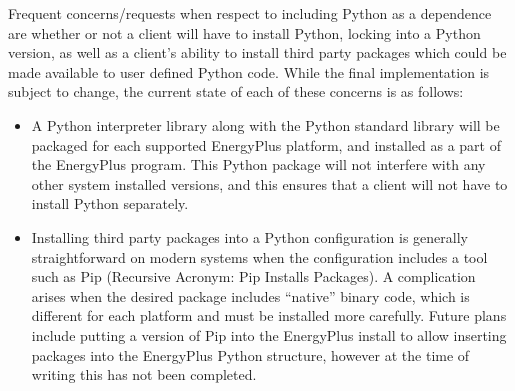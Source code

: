 \documentclass[5p, authoryear]{elsarticle}
\begin{document}
Frequent concerns/requests when respect to including Python as a dependence are whether or not a client will have to install Python, locking into a Python version, as well as a client’s ability to install third party packages which could be made available to user defined Python code.  While the final implementation is subject to change, the current state of each of these concerns is as follows:

\begin{itemize}
 \item A Python interpreter library along with the Python standard library will be packaged for each supported EnergyPlus platform, and installed as a part of the EnergyPlus program.  This Python package will not interfere with any other system installed versions, and this ensures that a client will not have to install Python separately.
 \item Installing third party packages into a Python configuration is generally straightforward on modern systems when the configuration includes a tool such as Pip (Recursive Acronym: Pip Installs Packages).  A complication arises when the desired package includes “native” binary code, which is different for each platform and must be installed more carefully.  Future plans include putting a version of Pip into the EnergyPlus install to allow inserting packages into the EnergyPlus Python structure, however at the time of writing this has not been completed.
\end{itemize}

 
 
\end{document}
